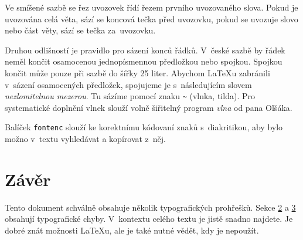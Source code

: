 \documentclass[a4paper,10pt,twocolumn]{article}
\begin{document}
Ve smíšené sazbě se řez uvozovek řídí řezem prvního uvozovaného slova. Pokud je uvozována celá věta, sází se koncová tečka před uvozovku, pokud se uvozuje slovo nebo část věty, sází se tečka za~uvozovku.

Druhou odlišností je pravidlo pro sázení konců řádků. V~české sazbě by řádek neměl končit osamocenou jednopísmennou předložkou nebo spojkou. Spojkou  končit může pouze při sazbě do šířky 25 liter. Abychom \LaTeX u zabránili v~sázení osamocených předložek, spojujeme je s~následujícím slovem \emph{nezlomitelnou mezerou}. Tu sázíme pomocí znaku \verb/~/ (vlnka, tilda). Pro systematické doplnění vlnek slouží volně šiřitelný program \emph{vlna} od pana Olšáka\footnotemark[2].

Balíček \texttt{fontenc} slouží ke korektnímu kódovaní znaků s~diakritikou, aby bylo možno v~textu vyhledávat a kopírovat z~něj.

\section{Závěr}

Tento dokument schválně obsahuje několik typografických prohřešků. Sekce \hyperref[section2]{2} a \hyperref[section3]{3} obsahují typografické chyby. V~kontextu celého textu je jistě snadno najdete. Je dobré znát možnosti \LaTeX u, ale je také nutné vědět, kdy je nepoužít.

\end{document}
